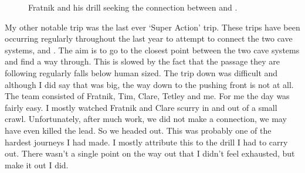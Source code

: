 \begin{figure}
\checkoddpage \ifoddpage \forcerectofloat \else \forceversofloat \fi
\centering
 \caption{Fratnik and his drill seeking the connection between  and . }
 \label{m2 drill}
\end{figure}



My other notable trip was the last ever ‘Super Action’ trip. These trips have been occurring regularly throughout the last year to attempt to connect the two cave systems,  and . The aim is to go to the closest point between the two cave systems and find a way through. This is slowed by the fact that the passage they are following regularly falls below human sized. The trip down was difficult and although I did say that  was big, the way down to the pushing front is not at all. The team consisted of Fratnik, Tim, Clare, Tetley and me. For me the day was fairly easy. I mostly watched Fratnik and Clare scurry in and out of a small crawl. Unfortunately, after much work, we did not make a connection, we may have even killed the lead. So we headed out. This was probably one of the hardest journeys I had made. I mostly attribute this to the drill I had to carry out. There wasn’t a single point on the way out that I didn’t feel exhausted, but make it out I did.

